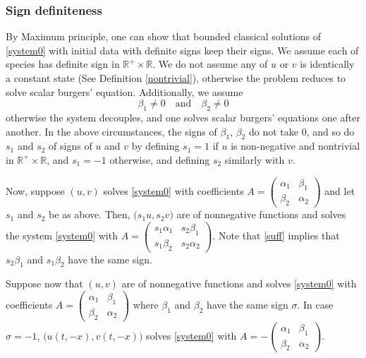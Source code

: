 \documentclass{amsart}
\theoremstyle{definition}
\numberwithin{equation}{section}
\begin{document}
\subsubsection{Sign definiteness}
By Maximum principle, one can show that bounded classical solutions of \eqref{system0} with initial data with definite signs keep their signs. We assume each of species has definite sign in $ \mathbb{R}^+\times \mathbb{R}$. We do not assume any of $u$ or $v$ is identically a constant state (See Definition \ref{nontrivial}), otherwise the problem reduces to solve scalar burgers' equation. Additionally, we assume
\begin{equation}
 \beta_1\ne 0 \quad \text{and} \quad \beta_2\ne0
\end{equation}
otherwise the system decouples, and one solves scalar burgers' equations one after another.  In the above circumstances, the signs of $\beta_1$, $\beta_2$ do not take $0$, and so do $s_1$ and $s_2$ of signs of $u$ and $v$ by defining $s_1=1$ if $u$ is non-negative and nontrivial in $ \mathbb{R}^+\times \mathbb{R}$, and $s_1=-1$ otherwise, and defining $s_2$ similarly with $v$.

Now, suppose $(u,v)$ solves \eqref{system0} with coefficients $A = \begin{pmatrix} \alpha_1 & \beta_1 \\ \beta_2 & \alpha_2 \end{pmatrix}$ and let $s_1$ and $s_2$ be as above. Then, $\big(s_1 u, s_2 v)$ are of nonnegative functions and solves the system \eqref{system0} with    $A = \begin{pmatrix} s_1 \alpha_1 & s_2 \beta_1 \\  s_1\beta_2 & s_2 \alpha_2 \end{pmatrix}$. Note that \eqref{suff} implies that $s_2\beta_1$ and $s_1\beta_2$ have the same sign. 

Suppose now that $(u,v)$ are of nonnegative functions and solves \eqref{system0} with coefficients $A = \begin{pmatrix} \alpha_1 & \beta_1 \\ \beta_2 & \alpha_2 \end{pmatrix}$ where $\beta_1$ and $\beta_2$ have the same sign $\sigma$. In case $\sigma=-1$, $\big(u(t,-x), v(t,-x)\big)$ solves \eqref{system0} with    $A = -\begin{pmatrix} \alpha_1 & \beta_1 \\  \beta_2 & \alpha_2 \end{pmatrix}$. 
\end{document}
